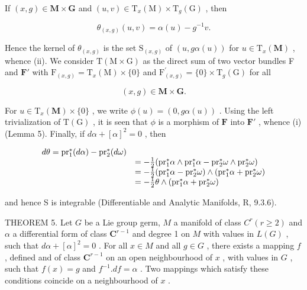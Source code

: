 If \((x,g)\in \mathbf{M}\times \mathbf{G}\) and \((u,v)\in \mathrm{T}_x(\mathrm{M})\times \mathrm{T}_g(\mathrm{G})\) , then

\[
\theta_ {(x, g)} (u, v) = \alpha (u) - g ^ {- 1} v.
\]

Hence the kernel of \(\theta_{(x,g)}\) is the set \(\mathrm{S}_{(x,g)}\) of \((u,g\alpha (u))\) for \(u\in \mathrm{T}_x(\mathbf{M})\) , whence (ii). We consider \(\mathrm{T}(\mathrm{M}\times \mathrm{G})\) as the direct sum of two vector bundles F and \(\mathbf{F}'\) with \(\mathrm{F}_{(x,g)} = \mathrm{T}_x(\mathrm{M})\times \{0\}\) and \(\mathrm{F}_{(x,g)}^{\prime} = \{0\} \times \mathrm{T}_g(\mathrm{G})\) for all

\[
(x, g) \in \mathbf {M} \times \mathbf {G}.
\]

For \(u \in \mathrm{T}_{x}(\mathbf{M}) \times \{0\}\) , we write \(\phi(u) = (0, g\alpha(u))\) . Using the left trivialization of \(\mathrm{T}(\mathrm{G})\) , it is seen that \(\phi\) is a morphism of \(\mathbf{F}\) into \(\mathbf{F}'\) , whence (i) (Lemma 5). Finally, if \(d\alpha + [\alpha]^2 = 0\) , then

\[
\begin{array}{r l} {d \theta = \mathrm{pr} _ {1} ^ {*} (d \alpha) - \mathrm{pr} _ {2} ^ {*} (d \omega)} \\ & {= - \frac {1}{2} (\mathrm{pr} _ {1} ^ {*} \alpha \wedge \mathrm{pr} _ {1} ^ {*} \alpha - \mathrm{pr} _ {2} ^ {*} \omega \wedge \mathrm{pr} _ {2} ^ {*} \omega)} \\ & {= - \frac {1}{2} (\mathrm{pr} _ {1} ^ {*} \alpha - \mathrm{pr} _ {2} ^ {*} \omega) \wedge (\mathrm{pr} _ {1} ^ {*} \alpha + \mathrm{pr} _ {2} ^ {*} \omega)} \\ & {= - \frac {1}{2} \theta \wedge (\mathrm{pr} _ {1} ^ {*} \alpha + \mathrm{pr} _ {2} ^ {*} \omega)} \end{array}
\]

and hence S is integrable (Differentiable and Analytic Manifolds, R, 9.3.6).

THEOREM 5. Let \(G\) be a Lie group germ, \(M\) a manifold of class \(C^r (r\geqslant 2)\) and \(\alpha\) a differential form of class \(\mathbf{C}^{r-1}\) and degree 1 on \(M\) with values in \(L(G)\) , such that \(d\alpha +[\alpha ]^2 = 0\) . For all \(x\in M\) and all \(g\in G\) , there exists a mapping \(f\) , defined and of class \(\mathbf{C}^{r-1}\) on an open neighbourhood of \(x\) , with values in \(G\) , such that \(f(x) = g\) and \(f^{-1}.df = \alpha\) . Two mappings which satisfy these conditions coincide on a neighbourhood of \(x\) .

